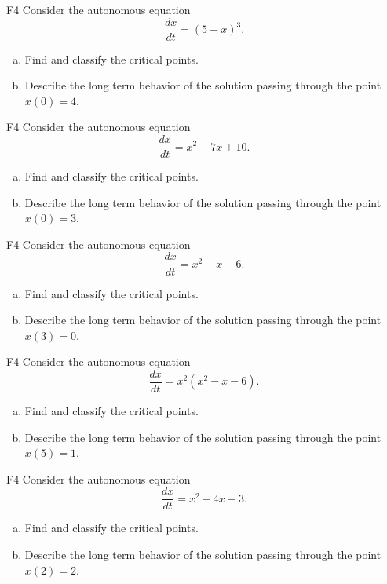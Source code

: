 \begin{problem}{F4}
Consider the autonomous equation
\[
\frac{dx}{dt} = (5 - x)^3.
\]
\begin{enumerate}[(a)]
\item Find and classify the critical points.
\item Describe the long term behavior of the solution passing through the point \(x(0)=4\).
\end{enumerate}
\end{problem}

\begin{problem}{F4}
Consider the autonomous equation
\[
\frac{dx}{dt} = x^2 - 7x + 10.
\]
\begin{enumerate}[(a)]
\item Find and classify the critical points.
\item Describe the long term behavior of the solution passing through the point \(x(0)=3\).
\end{enumerate}
\end{problem}

\begin{problem}{F4}
Consider the autonomous equation
\[
\frac{dx}{dt} = x^2 - x - 6.
\]
\begin{enumerate}[(a)]
\item Find and classify the critical points.
\item Describe the long term behavior of the solution passing through the point \(x(3)=0\).
\end{enumerate}
\end{problem}

\begin{problem}{F4}
Consider the autonomous equation
\[
\frac{dx}{dt} = x^2(x^2 - x - 6).
\]
\begin{enumerate}[(a)]
\item Find and classify the critical points.
\item Describe the long term behavior of the solution passing through the point \(x(5)=1\).
\end{enumerate}
\end{problem}

\begin{problem}{F4}
Consider the autonomous equation
\[
\frac{dx}{dt} = x^2 - 4x + 3.
\]
\begin{enumerate}[(a)]
\item Find and classify the critical points.
\item Describe the long term behavior of the solution passing through the point \(x(2)=2\).
\end{enumerate}
\end{problem}

